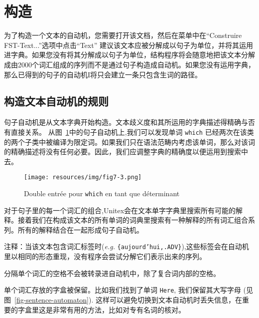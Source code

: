 \section{构造}
为了构造一个文本的自动机，您需要打开该文档，然后在菜单中在“Construire FST-Text...”选项中点击“Text”
 建议该文本应被分解成以句子为单位，并将其运用进字典。如果您没有将其分解成以句子为单位，结构程序将会随意地把该文本分解成由2000个词汇组成的序列而不是通过句子构造成自动机。如果您没有运用字典，那么已得到的句子的自动机I将只会建立一条只包含生词的路径。



\subsection{构造文本自动机的规则}
句子自动机是从文本字典开始构造。文本歧义度和其所运用的字典描述得精确与否有直接关系。
从图~\ref{fig-ambiguity-of-which}中的句子自动机上,我们可以发现单词
\verb+which+ 已经两次在该类的两个子类中被编译为限定词。如果我们只在语法范畴内考虑该单词，那么对该词的精确描述将没有任何必要。因此，我们应调整字典的精确度以便运用到搜索中去。 


\begin{figure}[!ht]
\begin{center}
\texttt{[image: resources/img/fig7-3.png]}
\caption{Double entrée pour \texttt{which} en tant que déterminant\label{fig-ambiguity-of-which}}
\end{center}
\end{figure}

\bigskip
\noindent 对于句子里的每一个词汇的组合,Unitex会在文本单字字典里搜索所有可能的解释。接着我们在构成该文本的所有单词的词典里搜索有一种解释的所有词汇组合系列。所有的解释结合在一起形成句子自动机。

\bigskip
\noindent 注释：当该文本包含词汇标签时(\textit{e.g.}
 \verb${aujourd’hui,.ADV}$),这些标签会在自动机里以相同的形态重现，没有程序会尝试分解它们表示出来的序列。 

\bigskip

\bigskip
\noindent 分隔单个词汇的空格不会被转录进自动机中，除了复合词内部的空格。


\bigskip
\noindent 单个词汇存放的字盒被保留。比如我们找到了单词
\verb+Here+, 我们保留其大写字母 (见图~\ref{fig-sentence-automaton}). 这样可以避免切换到文本自动机时丢失信息，在重要的字盒里这是非常有用的方法，比如对专有名词的核对。


